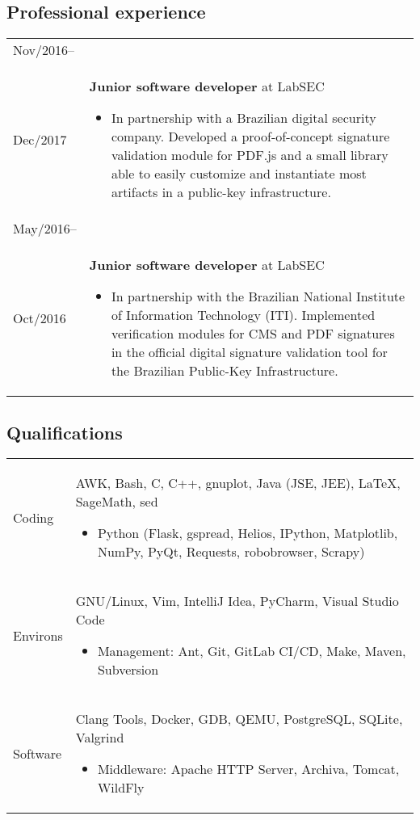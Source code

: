 \documentclass[12pt]{article}
\makeatletter
\newenvironment{sidetable}
  {\newcolumntype{L}{>{\bf \raggedright}p{0.14\textwidth}}
   \newcolumntype{R}{p{0.80\textwidth}}
   \begin{tabular}{@{\hspace{0mm}}LR}}
  {\end{tabular}}
\newenvironment{contenttable}[1]
  {\subsection*{#1}
   \begin{sidetable}}
  {\end{sidetable}}
\makeatother
\begin{document}
\begin{contenttable}{Professional experience}
  Nov/2016-- \\ Dec/2017 & \textbf{Junior software developer} at LabSEC
  \begin{itemize}
    \item In partnership with a Brazilian digital security company. Developed a
        proof-of-concept signature validation module for PDF.js and a small
          library able to easily customize and instantiate most artifacts in a
          public-key infrastructure.
  \end{itemize} \\

  May/2016-- \\ Oct/2016 & \textbf{Junior software developer} at LabSEC
  \begin{itemize}
    \item In partnership with the Brazilian National Institute of Information
        Technology (ITI). Implemented verification modules for CMS and PDF
          signatures in the official digital signature validation tool for the
          Brazilian Public-Key Infrastructure.
  \end{itemize}
\end{contenttable}

\begin{contenttable}{Qualifications}
  Coding & AWK, Bash, C, C++, gnuplot, Java (JSE, JEE), \LaTeX{}, SageMath, sed
    \begin{itemize}
      \item Python (Flask, gspread, Helios, IPython, Matplotlib, NumPy, PyQt,
          Requests, robobrowser, Scrapy)
    \end{itemize} \\

  Environs & GNU/Linux, Vim, IntelliJ Idea, PyCharm, Visual Studio Code
  \begin{itemize}
    \item Management: Ant, Git, GitLab CI/CD, Make, Maven, Subversion
  \end{itemize} \\

  Software & Clang Tools, Docker, GDB, QEMU, PostgreSQL, SQLite,
    Valgrind
  \begin{itemize}
    \item Middleware: Apache HTTP Server, Archiva, Tomcat, WildFly
  \end{itemize}
\end{contenttable}


\nobibliography{\jobname}
\end{document}
